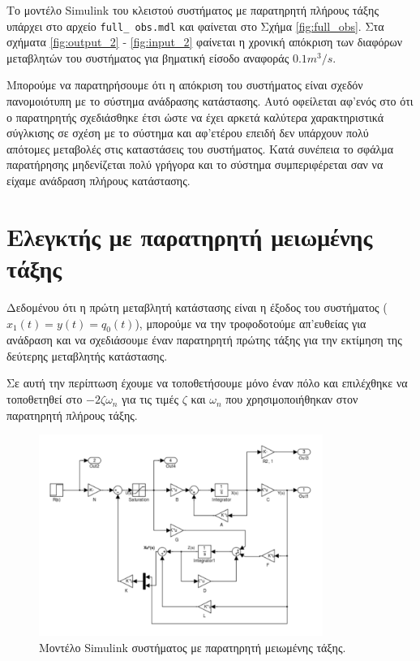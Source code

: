 \documentclass[a4paper, 11pt, english, greek]{article}
\begin{document}
Το μοντέλο \textlatin{Simulink} του κλειστού συστήματος με παρατηρητή πλήρους τάξης υπάρχει στο αρχείο
\textlatin{\texttt{full\_ obs.mdl}} και φαίνεται στο Σχήμα \ref{fig:full_obs}.
Στα σχήματα \ref{fig:output_2} - \ref{fig:input_2} φαίνεται η χρονική απόκριση των διαφόρων μεταβλητών του
συστήματος για βηματική είσοδο αναφοράς $0.1 m^3/s$.

Μπορούμε να παρατηρήσουμε ότι η απόκριση του συστήματος είναι σχεδόν πανομοιότυπη με το σύστημα ανάδρασης κατάστασης.
Αυτό οφείλεται αφ'ενός στο ότι ο παρατηρητής σχεδιάσθηκε έτσι ώστε να έχει αρκετά καλύτερα χαρακτηριστικά σύγλκισης
σε σχέση με το σύστημα και αφ'ετέρου επειδή δεν υπάρχουν πολύ απότομες μεταβολές στις καταστάσεις του συστήματος.
Κατά συνέπεια το σφάλμα παρατήρησης μηδενίζεται πολύ γρήγορα και το σύστημα συμπεριφέρεται σαν να είχαμε ανάδραση
πλήρους κατάστασης.

\section{Ελεγκτής με παρατηρητή μειωμένης τάξης}
Δεδομένου ότι η πρώτη μεταβλητή κατάστασης είναι η έξοδος του συστήματος ($x_1(t) = y(t) = q_0(t)$), μπορούμε
να την τροφοδοτούμε απ'ευθείας για ανάδραση και να σχεδιάσουμε έναν παρατηρητή πρώτης τάξης για την εκτίμηση
της δεύτερης μεταβλητής κατάστασης.

Σε αυτή την περίπτωση έχουμε να τοποθετήσουμε μόνο έναν πόλο και επιλέχθηκε να τοποθετηθεί στο
$-2\zeta ω_n$ για τις τιμές $\zeta$ και $ω_n$ που χρησιμοποιήθηκαν στον παρατηρητή πλήρους τάξης.

\begin{figure}[h]
  \centering
  \includegraphics[width=350px]{reduced_obs}
  \caption{Μοντέλο \textlatin{Simulink} συστήματος με παρατηρητή μειωμένης τάξης.}
  \label{fig:reduced_obs}
\end{figure}
\end{document}
